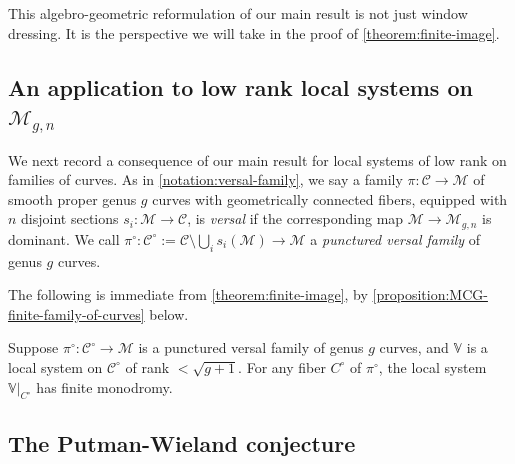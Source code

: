 This algebro-geometric reformulation of our main result is not just window
dressing. It is the perspective we will take in the proof of \autoref{theorem:finite-image}.

\subsection{An application to low rank local systems on $\mathscr M_{g,n}$}

We next record a consequence of our main result for local systems of low rank on families of curves.
As in \autoref{notation:versal-family}, we say a family $\pi:\mathscr C \to \mathscr M$ of smooth proper genus
$g$ curves with geometrically connected fibers, equipped with $n$ disjoint sections $s_i: \mathscr M \to
\mathscr C$, is {\em versal} if the corresponding map $\mathscr M \to \mathscr M_{g,n}$
is dominant. We call
$\pi^\circ: \mathscr C^\circ := \mathscr C \setminus \bigcup_i s_i(\mathscr M)\to \mathscr
M$ a {\em punctured versal family} of genus $g$ curves.

The following is immediate from \autoref{theorem:finite-image}, by \autoref{proposition:MCG-finite-family-of-curves} below.
\begin{corollary}
\notready
	\label{corollary:}
	Suppose $\pi^\circ: \mathscr C^\circ \to \mathscr M$
	is a punctured versal family of genus $g$ curves,
	and $\mathbb V$ is a local system on $\mathscr C^\circ$ of rank $<
	\sqrt{g+1}$.
	For any fiber $C^\circ$ of $\pi^\circ$, the local system $\mathbb
	V|_{C^\circ}$ has finite monodromy.
\end{corollary}

\subsection{The Putman-Wieland conjecture}
\label{subsection:intro-putman-wieland}

